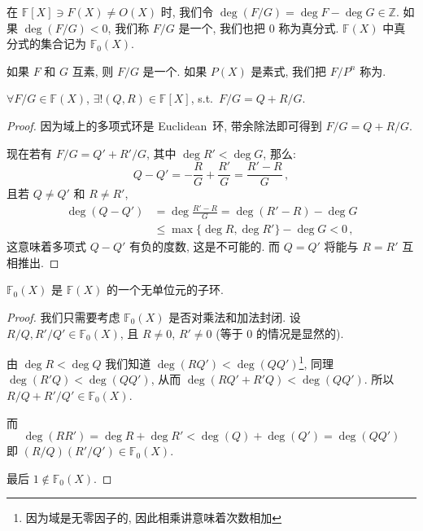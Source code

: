 \documentclass[openany, a5paper, oneside]{ctexbook}
\begin{document}
在 $\mathbb F[X] \ni F(X) \neq O(X)$ 时, 我们令 $\deg (F/G) = \deg F - \deg G \in \mathbb Z$. 如果 $\deg (F/G) < 0$, 我们称 $F/G$ 是一个, 我们也把 $0$ 称为真分式. $\mathbb F(X)$ 中真分式的集合记为 $\mathbb F_0(X)$.

如果 $F$ 和 $G$ 互素, 则 $F/G$ 是一个. 如果 $P(X)$ 是素式, 我们把 $F/P^n$ 称为.

\begin{theorem}
	$\forall F/G \in \mathbb F(X)$, $\exists! (Q, R) \in \mathbb F[X]$, s.t.\ $F/G = Q + R/G$. 
\end{theorem}
\begin{proof}
	因为域上的多项式环是 Euclidean~环, 带余除法即可得到 $F/G = Q + R/G$.

	现在若有 $F/G = Q' + R'/G$, 其中 $\deg R' < \deg G$, 那么:
	\begin{equation*}
		Q - Q' = - \frac{R}{G} + \frac{R'}{G}
			= \frac{R' - R}{G}\,,
	\end{equation*}
	且若 $Q \neq Q'$ 和 $R \neq R'$, 
	\begin{align*}
		\deg (Q - Q') &= \deg \frac{R' - R}{G} 
			= \deg (R' - R) - \deg G 
			\\
		&\leq \max\{\deg R, \deg R'\} - \deg G
			< 0\,,
	\end{align*}
	这意味着多项式 $Q - Q'$ 有负的度数, 这是不可能的. 而 $Q = Q'$ 将能与 $R = R'$ 互相推出. 
\end{proof}

\begin{theorem}[真分式是环]
	$\mathbb F_0(X)$ 是 $\mathbb F(X)$ 的一个无单位元的子环.
\end{theorem}
\begin{proof}
	我们只需要考虑 $\mathbb F_0(X)$ 是否对乘法和加法封闭.
	设 $R/Q, R'/Q' \in \mathbb F_0(X)$, 且 $R \neq 0$, $R' \neq 0$ (等于 $0$ 的情况是显然的). 
	
	由 $\deg R < \deg Q$ 我们知道 $\deg (RQ') < \deg (QQ')$\footnote{因为域是无零因子的, 因此相乘讲意味着次数相加}, 同理 $\deg(R'Q) < \deg (QQ')$, 从而 $\deg(RQ' + R'Q) < \deg(QQ')$. 所以 $R/Q + R'/Q' \in \mathbb F_0(X)$.

	而
	\begin{equation*}
		\deg(RR') = \deg R + \deg R' < \deg(Q) + \deg(Q') = \deg(QQ')
	\end{equation*}
	即 $(R/Q)(R'/Q') \in \mathbb F_0(X)$. 

	最后 $1 \notin \mathbb F_0(X)$.
\end{proof}
\end{document}
